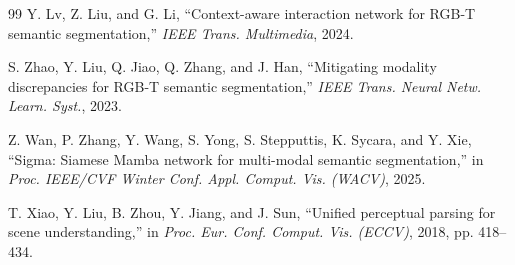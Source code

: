 \documentclass[10pt,conference]{IEEEtran}
\begin{document}
\begin{thebibliography}{99}
 Y. Lv, Z. Liu, and G. Li, ``Context-aware interaction network for RGB-T semantic segmentation,'' \textit{IEEE Trans. Multimedia}, 2024.

 S. Zhao, Y. Liu, Q. Jiao, Q. Zhang, and J. Han, ``Mitigating modality discrepancies for RGB-T semantic segmentation,'' \textit{IEEE Trans. Neural Netw. Learn. Syst.}, 2023.

 Z. Wan, P. Zhang, Y. Wang, S. Yong, S. Stepputtis, K. Sycara, and Y. Xie, ``Sigma: Siamese Mamba network for multi-modal semantic segmentation,'' in \textit{Proc. IEEE/CVF Winter Conf. Appl. Comput. Vis. (WACV)}, 2025.

 T. Xiao, Y. Liu, B. Zhou, Y. Jiang, and J. Sun, ``Unified perceptual parsing for scene understanding,'' in \textit{Proc. Eur. Conf. Comput. Vis. (ECCV)}, 2018, pp. 418--434.
\end{thebibliography}
\end{document}
